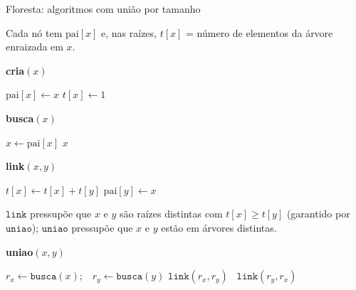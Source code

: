 \documentclass[aspectratio=169,10pt]{beamer}
\newcommand{\Busca}{\mathtt{busca}}
\newcommand{\Uniao}{\mathtt{uniao}}
\newcommand{\Link}{\mathtt{link}}
\begin{document}
\begin{frame}[t]{Floresta: algoritmos com união por tamanho}

  Cada nó tem $\mathrm{pai}[x]$ e, nas raízes, $t[x]$ = número de
  elementos da árvore enraizada em $x$.

  \medskip
  \begin{minipage}[t]{.3\linewidth}
    \textbf{cria$(x)$}
    \begin{algorithmic}[1]
      \State $\mathrm{pai}[x]\gets x$
      \State $t[x]\gets1$
    \end{algorithmic}
  \end{minipage}
  \hfill
  \begin{minipage}[t]{.33\linewidth}
    \textbf{busca$(x)$}
    \begin{algorithmic}[1]
      \State $x\gets\mathrm{pai}[x]$
      \EndWhile
      \State \Return $x$
    \end{algorithmic}
  \end{minipage}
  \hfill
  \begin{minipage}[t]{.3\linewidth}
    \textbf{link$(x,y)$}
    \begin{algorithmic}[1]
      \State $t[x]\gets t[x]+t[y]$
      \State $\mathrm{pai}[y]\gets x$
    \end{algorithmic}
  \end{minipage}

  \medskip
  $\Link$ pressupõe que $x$ e $y$ são raízes distintas com
  $t[x]\geq t[y]$ (garantido por $\Uniao$); $\Uniao$ pressupõe que $x$ e
  $y$ estão em árvores distintas.

  \medskip
  \textbf{uniao$(x,y)$}
  \begin{algorithmic}[1]
    \State $r_x\gets\Busca(x)$;\ \ $r_y\gets\Busca(y)$
     \State $\Link(r_x,r_y)$
    \Else\ \State $\Link(r_y,r_x)$
    \EndIf
  \end{algorithmic}
\end{frame}
\end{document}
